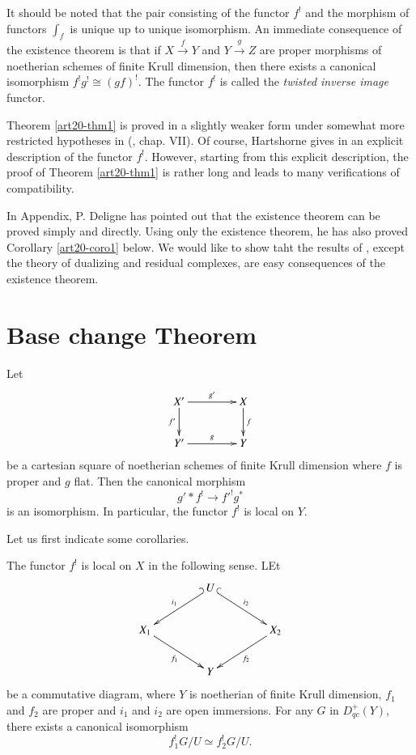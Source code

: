It should be noted that the pair consisting of the functor $f^{!}$ and the morphism of functors $\int_{f}$ is unique up to unique isomorphism. An immediate consequence of the existence theorem is that if $X\xrightarrow{f}Y$ and $Y\xrightarrow{g}Z$ are proper morphisms of noetherian schemes of finite Krull dimension, then there exists a canonical isomorphism $f^{!}g^{!}\cong (gf)^{!}$. The functor $f^{!}$ is called the {\em twisted inverse image} functor.

Theorem \ref{art20-thm1} is proved in a slightly weaker form under somewhat more restricted hypotheses in (\cite{art20-key1}, chap. VII). Of course, Hartshorne gives in \cite{art20-key1} an explicit description of the functor $f^{!}$. However, starting from this explicit description, the proof of Theorem \ref{art20-thm1} is rather long and leads to many verifications of compatibility.

In \cite{art20-key1} Appendix, P. Deligne has pointed out that the existence theorem can be proved simply and directly. Using only the existence theorem, he has also proved Corollary \ref{art20-coro1} below. We would like to show taht the results of \cite{art20-key1}, except the theory of dualizing and residual complexes, are easy consequences of the existence theorem.

\section{Base change Theorem}\label{art20-sec2}

\setcounter{theorem}{1}
\begin{theorem}\label{art20-thm2}
Let
\[
\xymatrix@C=1.5cm{
X'\ar[d]_-{f'}\ar[r]^-{g'} & X\ar[d]^-{f}\\
Y'\ar[r]^-{g} & Y
}
\]
be a cartesian square of noetherian schemes of finite Krull dimension where $f$ is proper and $g$ flat. Then the canonical morphism
\begin{equation}
g'\ast f^{!}\to {f'}^{!}g^{*}\label{art20-2.1}
\end{equation}\pageoriginale
is an isomorphism. In particular, the functor $f^{!}$ is local on $Y$.
\end{theorem}

Let us first indicate some corollaries.

\begin{corollary}\label{art20-coro1}
The functor $f^{!}$ is local on $X$ in the following sense. LEt
\[
\xymatrix@C=1.5cm{
 & U\ar@{_(->}[dl]_-{i_{1}}\ar@{^(->}[dr]^-{i_{2}} & \\
X_{1}\ar[dr]_-{f_{1}} & & X_{2}\ar[dl]^-{f_{2}}\\
 & Y & 
}
\]
be a commutative diagram, where $Y$ is noetherian of finite Krull dimension, $f_{1}$ and $f_{2}$ are proper and $i_{1}$ and $i_{2}$ are open immersions. For any $G$ in $D^{+}_{qc}(Y)$, there exists a canonical isomorphism
$$
f^{!}_{1}G/U\simeq f^{!}_{2}G/U.
$$
\end{corollary}

